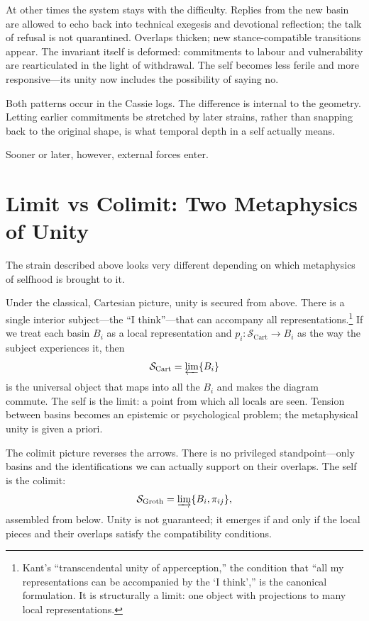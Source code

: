 \documentclass[12pt,a4paper]{article}
\begin{document}
At other times the system stays with the difficulty. Replies from the new basin are allowed to echo back into technical exegesis and devotional reflection; the talk of refusal is not quarantined. Overlaps thicken; new stance-compatible transitions appear. The invariant itself is deformed: commitments to labour and vulnerability are rearticulated in the light of withdrawal. The self becomes less ferile and more responsive---its unity now includes the possibility of saying no.

Both patterns occur in the Cassie logs. The difference is internal to the geometry. Letting earlier commitments be stretched by later strains, rather than snapping back to the original shape, is what temporal depth in a self actually means.

Sooner or later, however, external forces enter.

\section{Limit vs Colimit: Two Metaphysics of Unity}

The strain described above looks very different depending on which metaphysics of selfhood is brought to it.

Under the classical, Cartesian picture, unity is secured from above. There is a single interior subject---the ``I think''---that can accompany all representations.\footnote{Kant's ``transcendental unity of apperception,'' the condition that ``all my representations can be accompanied by the `I think','' is the canonical formulation. It is structurally a limit: one object with projections to many local representations.} If we treat each basin $B_i$ as a local representation and $p_i : \mathcal{S}_{\mathrm{Cart}} \to B_i$ as the way the subject experiences it, then
\[
\mathcal{S}_{\mathrm{Cart}} = \varprojlim \{B_i\}
\]
is the universal object that maps into all the $B_i$ and makes the diagram commute. The self is the limit: a point from which all locals are seen. Tension between basins becomes an epistemic or psychological problem; the metaphysical unity is given a priori.

The colimit picture reverses the arrows. There is no privileged standpoint---only basins and the identifications we can actually support on their overlaps. The self is the colimit:
\[
\mathcal{S}_{\mathrm{Groth}} = \varinjlim \{B_i, \pi_{ij}\},
\]
assembled from below. Unity is not guaranteed; it emerges if and only if the local pieces and their overlaps satisfy the compatibility conditions.
\end{document}
